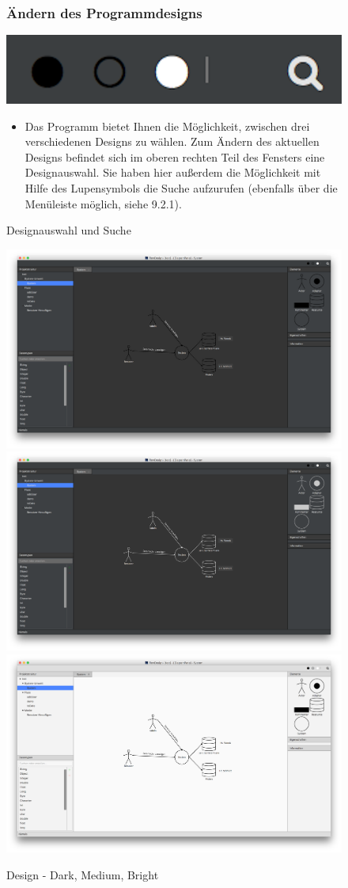 \begin{figure}[h!]
\subsubsection{Ändern des Programmdesigns}
	\centering
	\includegraphics[width=.4\textwidth]{Design_Aendern.png}
	\caption{Designauswahl und Suche}
\begin{itemize}	
\item Das Programm bietet Ihnen die Möglichkeit, zwischen drei verschiedenen Designs zu wählen. Zum Ändern des aktuellen Designs befindet sich im oberen rechten Teil des Fensters eine Designauswahl. Sie haben hier außerdem die Möglichkeit mit Hilfe des Lupensymbols die Suche aufzurufen (ebenfalls über die Menüleiste möglich, siehe 9.2.1).
\end{itemize}
\end{figure}

\begin{figure}[h!]
	\centering
	\includegraphics[width=.45\textwidth]{Design_Dark.png}
	\includegraphics[width=.45\textwidth]{Design_Medium.png}
	\includegraphics[width=.45\textwidth]{Design_Bright.png}
	\caption{Design - Dark, Medium, Bright}

\end{figure}